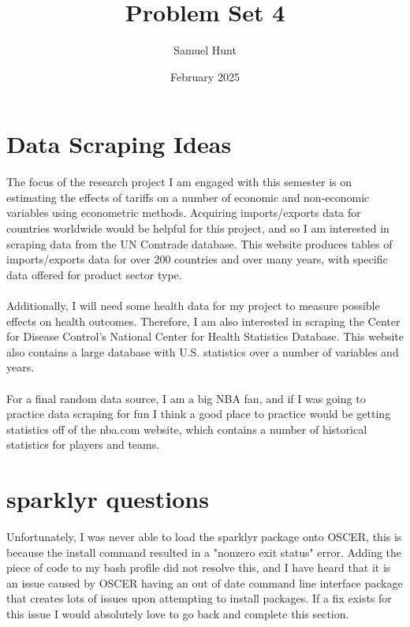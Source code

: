 \documentclass{article}
\title{Problem Set 4}
\author{Samuel Hunt}
\date{February 2025}
\begin{document}
\maketitle

\section{Data Scraping Ideas}
The focus of the research project I am engaged with this semester is on estimating the effects of tariffs on a number of economic and non-economic variables using econometric methods. Acquiring imports/exports data for countries worldwide would be helpful for this project, and so I am interested in scraping data from the UN Comtrade database. This website produces tables of imports/exports data for over 200 countries and over many years, with specific data offered for product sector type.
\\
\\Additionally, I will need some health data for my project to measure possible effects on health outcomes. Therefore, I am also interested in scraping the Center for Disease Control's National Center for Health Statistics Database. This website also contains a large database with U.S. statistics over a number of variables and years.
\\
\\For a final random data source, I am a big NBA fan, and if I was going to practice data scraping for fun I think a good place to practice would be getting statistics off of the nba.com website, which contains a number of historical statistics for players and teams.

\section{sparklyr questions}
Unfortunately, I was never able to load the sparklyr package onto OSCER, this is because the install command resulted in a "nonzero exit status" error. Adding the piece of code to my bash profile did not resolve this, and I have heard that it is an issue caused by OSCER having an out of date command line interface package that creates lots of issues upon attempting to install packages. If a fix exists for this issue I would absolutely love to go back and complete this section.
\end{document}
